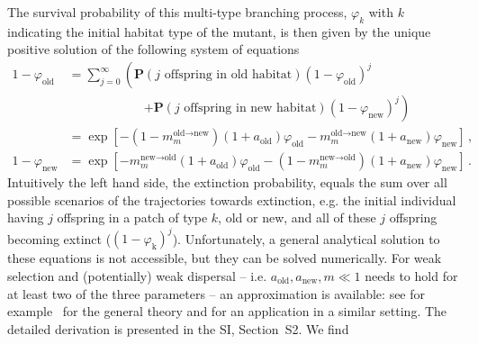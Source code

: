 \documentclass[11pt]{article}
\begin{document}
The survival probability of this multi-type branching process, $\varphi_{k}$ with $k$ indicating the initial habitat type of the mutant, is then given by the unique positive solution of the following system of equations \citep[see][Chapters 5.3 and 5.6]{haccou_book}
\begin{equation}\label{eq:ext_prob}
	\begin{aligned}
		1-\varphi_{\text{old}} &= \sum_{j=0}^{\infty}\left( \mathbf{P}(j \text{ offspring in old habitat})(1-\varphi_{\text{old}})^j \right. \\
		&\qquad \qquad \qquad \left.+ \mathbf{P}(j \text{ offspring in new habitat})(1-\varphi_{\text{new}})^j\right)\\
		&=\exp\left[-\left(1-m^{\text{old}\to \text{new}}_m\right)(1+a_{\text{old}})\varphi_{\text{old}} - m^{\text{old}\to \text{new}}_m (1+a_{\text{new}}) \varphi_{\text{new}}\right]\, ,   \\
		1-\varphi_{\text{new}} &= \exp\left[-m^{\text{new}\to \text{old}}_m(1+a_{\text{old}})\varphi_{\text{old}} - \left(1-m^{\text{new}\to \text{old}}_m\right) (1+a_{\text{new}}) \varphi_{\text{new}}\right]\, .
	\end{aligned}
\end{equation}
Intuitively the left hand side, the extinction probability, equals the sum over all possible scenarios of the trajectories towards extinction, e.g. the initial individual having $j$ offspring in a patch of type $k$, old or new, and all of these $j$ offspring becoming extinct ($(1-\varphi_{\text{k}})^j$). Unfortunately, a general analytical solution to these equations is not accessible, but they can be solved numerically. For weak selection and (potentially) weak dispersal -- i.e. $a_{\text{old}},a_{\text{new}},m\ll 1$ needs to hold for at least two of the three parameters -- an approximation is available: see for example~\citet[Theorem~5.6]{haccou_book} for the general theory and \citet{tomasini_2018} for an application in a similar setting. The detailed derivation is presented in the SI, Section~S2. We find
\end{document}
